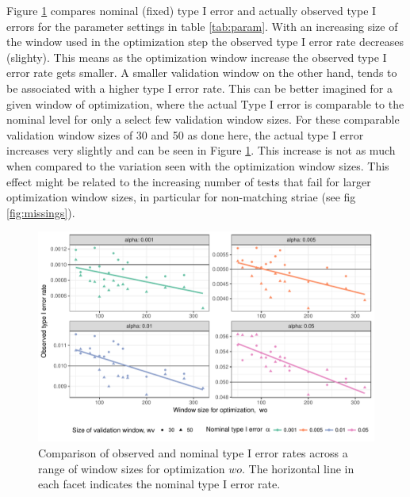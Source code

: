 \documentclass[12pt]{article}
\begin{document}
Figure \ref{fig:type1} compares nominal (fixed) type I error and
actually observed type I errors for the parameter settings in table
\ref{tab:param}. With an increasing size of the window used in the
optimization step the observed type I error rate decreases (slighty).
This means as the optimization window increase the observed type I error
rate gets smaller. A smaller validation window on the other hand, tends
to be associated with a higher type I error rate. This can be better
imagined for a given window of optimization, where the actual Type I
error is comparable to the nominal level for only a select few
validation window sizes. For these comparable validation window sizes of
30 and 50 as done here, the actual type I error increases very slightly
and can be seen in Figure \ref{fig:type1}. This increase is not as much
when compared to the variation seen with the optimization window sizes.
This effect might be related to the increasing number of tests that fail
for larger optimization window sizes, in particular for non-matching
striae (see fig \ref{fig:missings}).

\begin{figure}

{\centering \includegraphics[width=\textwidth]{figures/type1-1} 

}

\caption{Comparison of observed and nominal type I error rates  across a range of window sizes for optimization $wo$. The horizontal line in each facet indicates the nominal type I error rate.}\label{fig:type1}
\end{figure}
\end{document}
